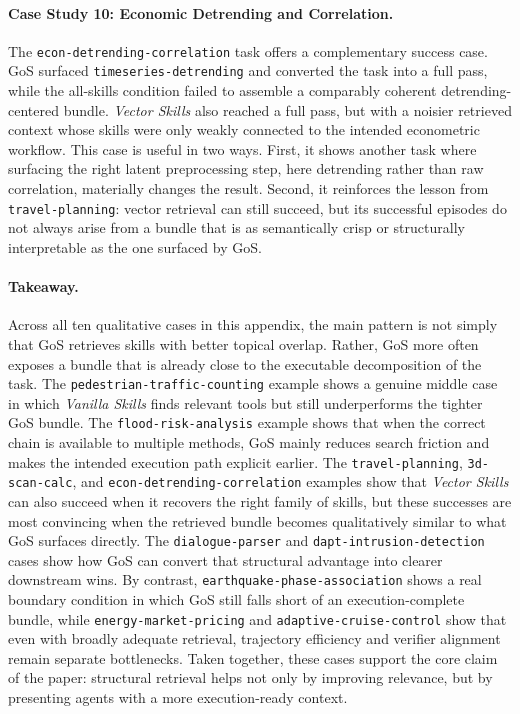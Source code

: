 \paragraph{Case Study 10: Economic Detrending and Correlation.} The \texttt{econ-detrending-correlation} task offers a complementary success case. GoS surfaced \texttt{timeseries-detrending} and converted the task into a full pass, while the all-skills condition failed to assemble a comparably coherent detrending-centered bundle. \textit{Vector Skills} also reached a full pass, but with a noisier retrieved context whose skills were only weakly connected to the intended econometric workflow. This case is useful in two ways. First, it shows another task where surfacing the right latent preprocessing step, here detrending rather than raw correlation, materially changes the result. Second, it reinforces the lesson from \texttt{travel-planning}: vector retrieval can still succeed, but its successful episodes do not always arise from a bundle that is as semantically crisp or structurally interpretable as the one surfaced by GoS.

\paragraph{Takeaway.} Across all ten qualitative cases in this appendix, the main pattern is not simply that GoS retrieves skills with better topical overlap. Rather, GoS more often exposes a bundle that is already close to the executable decomposition of the task. The \texttt{pedestrian-traffic-counting} example shows a genuine middle case in which \textit{Vanilla Skills} finds relevant tools but still underperforms the tighter GoS bundle. The \texttt{flood-risk-analysis} example shows that when the correct chain is available to multiple methods, GoS mainly reduces search friction and makes the intended execution path explicit earlier. The \texttt{travel-planning}, \texttt{3d-scan-calc}, and \texttt{econ-detrending-correlation} examples show that \textit{Vector Skills} can also succeed when it recovers the right family of skills, but these successes are most convincing when the retrieved bundle becomes qualitatively similar to what GoS surfaces directly. The \texttt{dialogue-parser} and \texttt{dapt-intrusion-detection} cases show how GoS can convert that structural advantage into clearer downstream wins. By contrast, \texttt{earthquake-phase-association} shows a real boundary condition in which GoS still falls short of an execution-complete bundle, while \texttt{energy-market-pricing} and \texttt{adaptive-cruise-control} show that even with broadly adequate retrieval, trajectory efficiency and verifier alignment remain separate bottlenecks. Taken together, these cases support the core claim of the paper: structural retrieval helps not only by improving relevance, but by presenting agents with a more execution-ready context.
